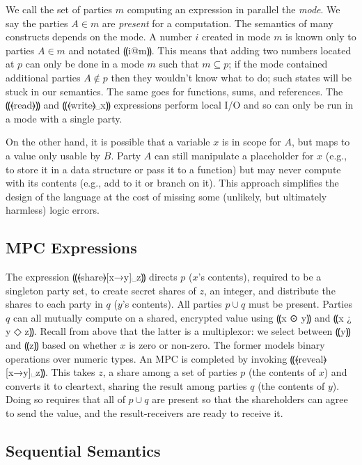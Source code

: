 We call the set of parties $m$ computing an expression in parallel
the \emph{mode}. We say the parties $A \in m$ are \emph{present}
for a computation. The semantics of many constructs depends on the
mode. A number $i$ created in mode $m$ is
known only to parties $A \in m$ and notated ⸨i@m⸩. This means that adding two numbers
located at $p$ can only be done in a mode $m$ such that
$m \subseteq p$; if the mode contained additional parties
$A \not\in p$ then they wouldn't know what to do; such states will be
stuck in our semantics. The same goes for functions, sums, and
references. The ⸨⦑read⦒⸩ and ⸨⦑write⦒␣x⸩ expressions perform local
I/O and so can only be run in a mode with a single party.

On the other hand, it is possible that a variable $x$ is in scope for
$A$, but maps to a value only usable by $B$. Party $A$ can
still manipulate a placeholder for $x$ (e.g., to store it in a
data structure or pass it to a function) but may never compute with its
contents (e.g., add to it or branch on it). This approach
simplifies the design of the language at the cost of missing some
(unlikely, but ultimately harmless) logic errors.

\subsection{MPC Expressions}
\label{subsec:mpc-design-mpc}

The \mpc expression ⸨⦑share⦒[x→y]␣z⸩ directs $p$ ($x$'s contents),
required to be a singleton party set, to create secret shares of $z$,
an integer, and distribute the shares to each party in
$q$ ($y$'s contents). All parties $p \cup q$ must be present.
Parties $q$ can all mutually compute on a shared, encrypted value
using ⸨x {⊙} y⸩ and ⸨x {¿} y {◇} z⸩.  Recall from above that the latter is a
multiplexor: we select between ⸨y⸩ and ⸨z⸩ based on whether $x$ is zero or
non-zero. The former models binary operations over numeric types.
An MPC is completed by invoking ⸨⦑reveal⦒[x→y]␣z⸩. This takes $z$, a share
among a set of parties $p$ (the contents of $x$) and converts it to cleartext,
sharing the result among parties $q$ (the contents of $y$). Doing so requires that all of
$p \cup q$ are present so that the shareholders can agree to send the value,
and the result-receivers are ready to receive it.

\subsection{Sequential Semantics}
\label{subsec:mpc-design-seq}

